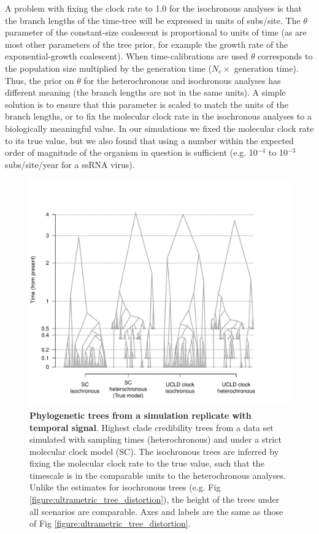 \documentclass[10pt,letterpaper]{article}
\begin{document}
A problem with fixing the clock rate to 1.0 for the isochronous analyses is that the branch lengths of the time-tree will be expressed in units of subs/site. The $\theta$ parameter of the constant-size coalescent is proportional to units of time \cite{ho2011skyline, drummond2002estimating} (as are most other parameters of the tree prior, for example the growth rate of the exponential-growth coalescent). When time-calibrations are used $\theta$ corresponds to the population size multiplied by the generation time ($N_e \times$ generation time). Thus, the prior on $\theta$ for the heterochronous and isochronous analyses has different meaning (the branch lengths are not in the same units). A simple solution is to ensure that this parameter is scaled to match the units of the branch lengths, or to fix the molecular clock rate in the isochronous analyses to a biologically meaningful value. In our simulations we fixed the molecular clock rate to its true value, but we also found that using a number within the expected order of magnitude of the organism in question is sufficient (e.g. 10$^{-4}$ to 10$^{-3}$ subs/site/year for a ssRNA virus).

\begin{figure}[!h]
	\begin{center}
		\includegraphics[width=15cm]{figure_4.pdf}\newline
		\vspace{-0.5cm}
		\caption{\textbf{Phylogenetic trees from a simulation replicate with temporal signal}. Highest clade credibility trees from a data set simulated with sampling times (heterochronous) and under a strict molecular clock model (SC). The isochronous trees are inferred by fixing the molecular clock rate to the true value, such that the timescale is in the comparable units to the heterochronous analyses. Unlike the estimates for isochronous trees (e.g. Fig \ref{figure:ultrametric_tree_distortion}), the height of the trees  under all scenarios are comparable. Axes and labels are the same as those of Fig \ref{figure:ultrametric_tree_distortion}.}
		\label{figure:heterochronous_tree_distortion}
	\end{center}
\end{figure}
\end{document}
